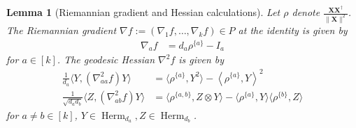 \documentclass{article}
\newtheorem{lemma}[theorem]{Lemma}
\renewcommand{\vec}{\bm}
\newcommand\Herm{\operatorname{Herm}}
\begin{document}
\begin{lemma}[Riemannian gradient and Hessian calculations]
Let $\rho$ denote $\frac{\vec X \vec X^\dagger}{\|\vec X\|^2}$. The Riemannian gradient $\nabla f := (\nabla_1 f, \dots, \nabla_k f) \in P $ at the identity is given by
\begin{align}
\nabla_a f &= d_a \rho^{\{a\}} -  I_{a}
\end{align}
for $a \in [k]$.
The geodesic Hessian $\nabla^2 f$ is given by
\begin{align}\frac{1}{d_a}\langle Y, (\nabla^{2}_{aa} f) Y \rangle &= \langle \rho^{\{a\}}, Y^{2} \rangle - \left\langle \rho^{\{a\}}, Y \right\rangle^{2} \\
\frac{1}{\sqrt{d_a d_b}}\langle Z, (\nabla^{2}_{ab} f) Y \rangle &= \langle \rho^{\{a,b\}}, Z \otimes Y \rangle  - \langle \rho^{\{a\}}, Y \rangle \langle \rho^{\{b\}}, Z \rangle
\end{align}
for $a \neq b \in [k]$, $Y \in \Herm_{d_a}, Z \in \Herm_{d_b}$.
\end{lemma}
\end{document}
